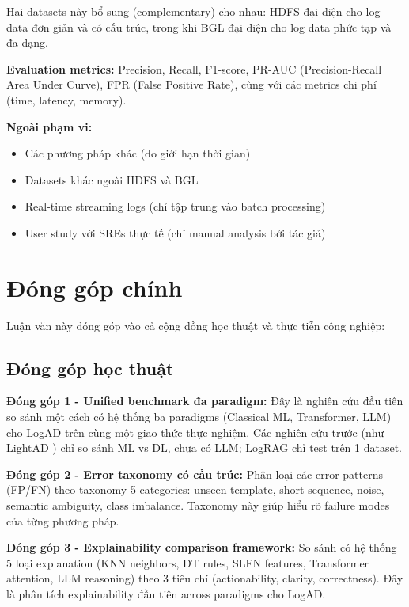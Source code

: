 Hai datasets này bổ sung (complementary) cho nhau: HDFS đại diện cho log data đơn giản và có cấu trúc, trong khi BGL đại diện cho log data phức tạp và đa dạng.

\textbf{Evaluation metrics:} Precision, Recall, F1-score, PR-AUC (Precision-Recall Area Under Curve), FPR (False Positive Rate), cùng với các metrics chi phí (time, latency, memory).

\textbf{Ngoài phạm vi:}
\begin{itemize}
    \item Các phương pháp khác (do giới hạn thời gian)
    \item Datasets khác ngoài HDFS và BGL
    \item Real-time streaming logs (chỉ tập trung vào batch processing)
    \item User study với SREs thực tế (chỉ manual analysis bởi tác giả)
\end{itemize}

\section{Đóng góp chính}
\label{sec:contributions}

Luận văn này đóng góp vào cả cộng đồng học thuật và thực tiễn công nghiệp:

\subsection{Đóng góp học thuật}

\textbf{Đóng góp 1 - Unified benchmark đa paradigm:} Đây là nghiên cứu đầu tiên so sánh một cách có hệ thống ba paradigms (Classical ML, Transformer, LLM) cho LogAD trên cùng một giao thức thực nghiệm. Các nghiên cứu trước (như LightAD \cite{yu2024lightad}) chỉ so sánh ML vs DL, chưa có LLM; LogRAG \cite{jiang2024lograg} chỉ test trên 1 dataset.

\textbf{Đóng góp 2 - Error taxonomy có cấu trúc:} Phân loại các error patterns (FP/FN) theo taxonomy 5 categories: unseen template, short sequence, noise, semantic ambiguity, class imbalance. Taxonomy này giúp hiểu rõ failure modes của từng phương pháp.

\textbf{Đóng góp 3 - Explainability comparison framework:} So sánh có hệ thống 5 loại explanation (KNN neighbors, DT rules, SLFN features, Transformer attention, LLM reasoning) theo 3 tiêu chí (actionability, clarity, correctness). Đây là phân tích explainability đầu tiên across paradigms cho LogAD.

